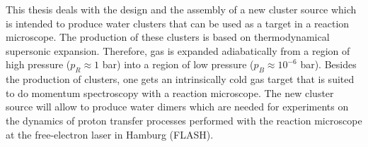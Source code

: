 \begin{center}\large{}\end{center}
%
This thesis deals with the design and the assembly of a new cluster source which is intended to produce water clusters that can be used as a target in a reaction microscope. The production of these clusters is based on thermodynamical supersonic expansion. Therefore, gas is expanded adiabatically from a region of high pressure ($p_R \approx 1 $ bar) into a region of low pressure ($p_B \approx 10^{-6}$ bar). Besides the production of clusters, one gets an intrinsically cold gas target that is suited to do momentum spectroscopy with a reaction microscope. The new cluster source will allow to produce water dimers which are needed for experiments on the dynamics of proton transfer processes performed with the reaction microscope at the free-electron laser in Hamburg (FLASH).





